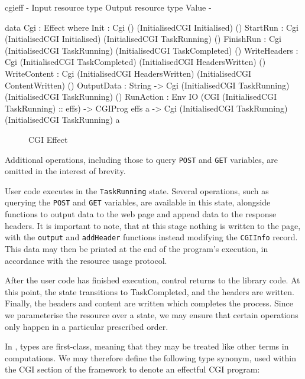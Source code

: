 \begin{SaveVerbatim}{cgieff}
{-                     { Input resource type }         { Output resource type }        { Value } -}

data Cgi : Effect where
    Init         : Cgi ()                              (InitialisedCGI Initialised)    ()
    StartRun     : Cgi (InitialisedCGI Initialised)    (InitialisedCGI TaskRunning)    ()
    FinishRun    : Cgi (InitialisedCGI TaskRunning)    (InitialisedCGI TaskCompleted)  ()
    WriteHeaders : Cgi (InitialisedCGI TaskCompleted)  (InitialisedCGI HeadersWritten) ()
    WriteContent : Cgi (InitialisedCGI HeadersWritten) (InitialisedCGI ContentWritten) ()
    OutputData   : String -> 
                   Cgi (InitialisedCGI TaskRunning)    (InitialisedCGI TaskRunning)    ()
    RunAction    : Env IO (CGI (InitialisedCGI TaskRunning) :: effs) -> CGIProg effs a -> 
                   Cgi (InitialisedCGI TaskRunning)    (InitialisedCGI TaskRunning)    a
\end{SaveVerbatim}

\begin{figure*}[t]
\begin{center}
\end{center}
\caption{CGI Effect}
\label{fig:cgieffect}
\end{figure*}

Additional operations, including those to query \texttt{POST} and \texttt{GET}
variables, are omitted in the interest of brevity.

User code executes in the \texttt{TaskRunning} state. Several operations, such
as querying the \texttt{POST} and \texttt{GET} variables, are available in this state, alongside
functions to output data to the web page and append data to the response
headers. It is important to note, that at this stage nothing is written to the
page, with the \texttt{output} and \texttt{addHeader} functions instead
modifying the \texttt{CGIInfo} record. This data may then be printed at the end of the
program's execution, in accordance with the resource usage protocol.

After the user code has finished execution, control returns to the library
code. At this point, the state transitions to TaskCompleted, and the headers
are written.  Finally, the headers and content are written which completes the
process. Since we parameterise the resource over a state, we may ensure that
certain operations only happen in a particular prescribed order.

In \idris{}, types are first-class, meaning that they may be treated like other
terms in computations. We may therefore define the following type synonym, used
within the CGI section of the framework to denote an effectful CGI program: 

